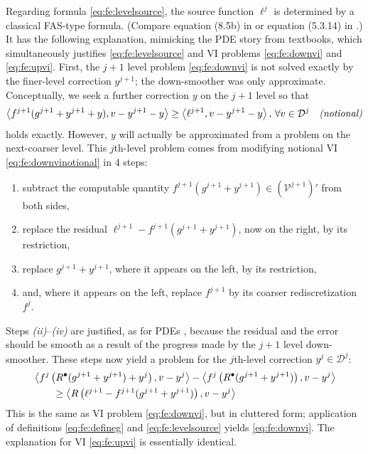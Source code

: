 \documentclass[letterpaper,final,12pt,reqno]{amsart}
\theoremstyle{cstyle}
\theoremstyle{cstyle*}
\theoremstyle{dstyle}
\numberwithin{equation}{section}
\numberwithin{figure}{section}
\numberwithin{table}{section}
\numberwithin{theorem}{section}
\newcommand{\ip}[2]{\left<#1,#2\right>}
\newcommand{\iR}{R^{\bullet}}
\begin{document}
Regarding formula \eqref{eq:fe:levelsource}, the source function $\ell^j$ is determined by a classical FAS-type formula.  (Compare equation (8.5b) in \cite{BrandtLivne2011} or equation (5.3.14) in \cite{Trottenbergetal2001}.)  It has the following explanation, mimicking the PDE story from textbooks, which simultaneously justifies \eqref{eq:fe:levelsource} and VI problems \eqref{eq:fe:downvi} and \eqref{eq:fe:upvi}.  First, the $j+1$ level problem \eqref{eq:fe:downvi} is not solved exactly by the finer-level correction $y^{j+1}$; the down-smoother was only approximate.  Conceptually, we seek a further correction $y$ on the $j+1$ level so that
\begin{equation}
\ip{f^{j+1}(g^{j+1}+y^{j+1}+y)}{v-y^{j+1}-y} \ge \ip{\ell^{j+1}}{v-y^{j+1}-y}, \, \forall v\in \mathcal{D}^j \quad \text{\emph{(notional)}} \label{eq:fe:downvinotional}
\end{equation}
holds exactly.  However, $y$ will actually be approximated from a problem on the next-coarser level.  This $j$th-level problem comes from modifying notional VI \eqref{eq:fe:downvinotional} in 4 steps:
\begin{enumerate}
\item subtract the computable quantity $f^{j+1}(g^{j+1}+y^{j+1}) \in (\mathcal{V}^{j+1})'$ from both sides,
\item replace the residual $\ell^{j+1}-f^{j+1}(g^{j+1}+y^{j+1})$, now on the right, by its restriction,
\item replace $g^{j+1}+y^{j+1}$, where it appears on the left, by its restriction,
\item and, where it appears on the left, replace $f^{j+1}$ by its coarser rediscretization $f^j$.
\end{enumerate}
Steps \emph{(ii)}--\emph{(iv)} are justified, as for PDEs \cite[subsection 5.3.4, for example]{Trottenbergetal2001}, because the residual and the error should be smooth as a result of the progress made by the $j+1$ level down-smoother.  These steps now yield a problem for the $j$th-level correction $y^j \in \mathcal{D}^j$:
\begin{align}
&\ip{f^j\left(\iR(g^{j+1}+y^{j+1})+y^j\right)}{v-y^j} - \ip{f^j\left(\iR(g^{j+1}+y^{j+1})\right)}{v-y^j} \label{eq:fe:downvicluttered} \\
&\qquad \ge \ip{R\left(\ell^{j+1}-f^{j+1}(g^{j+1}+y^{j+1})\right)}{v-y^j} \notag
\end{align}
This is the same as VI problem \eqref{eq:fe:downvi}, but in cluttered form; application of definitions \eqref{eq:fe:defineg} and \eqref{eq:fe:levelsource} yields \eqref{eq:fe:downvi}.  The explanation for VI \eqref{eq:fe:upvi} is essentially identical.
\end{document}
